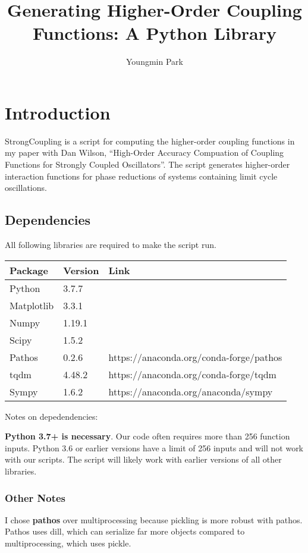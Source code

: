 \documentclass[english,a4paper,oneside]{article}
\title{Generating Higher-Order Coupling Functions: A Python Library}
\author{Youngmin Park}
\date{}
\begin{document}
\maketitle

{
\hypersetup{linkcolor=black}
\setcounter{tocdepth}{4}
\tableofcontents
}
\section{Introduction}\label{introduction}

StrongCoupling is a script for computing the higher-order coupling
functions in my paper with Dan Wilson, ``High-Order Accuracy Compuation
of Coupling Functions for Strongly Coupled Oscillators''. The script
generates higher-order interaction functions for phase reductions of
systems containing limit cycle oscillations.

\subsection{Dependencies}\label{dependencies}

All following libraries are required to make the script run.

\begin{longtable}[]{@{}lll@{}}
\toprule
Package & Version & Link\tabularnewline
\midrule
\endhead
Python & 3.7.7 &\tabularnewline
Matplotlib & 3.3.1 &\tabularnewline
Numpy & 1.19.1 &\tabularnewline
Scipy & 1.5.2 &\tabularnewline
Pathos & 0.2.6 & https://anaconda.org/conda-forge/pathos\tabularnewline
tqdm & 4.48.2 & https://anaconda.org/conda-forge/tqdm\tabularnewline
Sympy & 1.6.2 & https://anaconda.org/anaconda/sympy\tabularnewline
\bottomrule
\end{longtable}

Notes on depedendencies:

\textbf{Python 3.7+ is necessary}. Our code often requires more than 256
function inputs. Python 3.6 or earlier versions have a limit of 256
inputs and will not work with our scripts. The script will likely work
with earlier versions of all other libraries.

\subsubsection{Other Notes}\label{other-notes}

I chose \textbf{pathos} over multiprocessing because pickling is more
robust with pathos. Pathos uses dill, which can serialize far more
objects compared to multiprocessing, which uses pickle.
\end{document}
